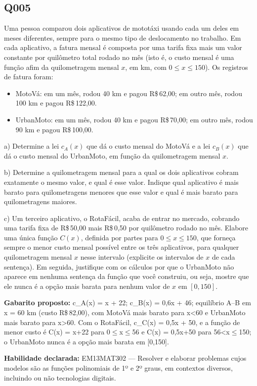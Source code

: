\documentclass[11pt,a4paper]{article}
\begin{document}
\begin{samepage}
\subsection*{Q005}
Uma pessoa comparou dois aplicativos de mototáxi usando cada um deles em meses diferentes, sempre para o mesmo tipo de deslocamento no trabalho. Em cada aplicativo, a fatura mensal é composta por uma tarifa fixa mais um valor constante por quilômetro total rodado no mês (isto é, o custo mensal é uma função afim da quilometragem mensal $x$, em km, com $0 \le x \le 150$). Os registros de fatura foram:

\begin{itemize}[nosep,leftmargin=*]
\item MotoVá: em um mês, rodou 40 km e pagou R\$\,62,00; em outro mês, rodou 100 km e pagou R\$\,122,00.
\item UrbanMoto: em um mês, rodou 40 km e pagou R\$\,70,00; em outro mês, rodou 90 km e pagou R\$\,100,00.
\end{itemize}

a) Determine a lei $c_A(x)$ que dá o custo mensal do MotoVá e a lei $c_B(x)$ que dá o custo mensal do UrbanMoto, em função da quilometragem mensal $x$.

b) Determine a quilometragem mensal para a qual os dois aplicativos cobram exatamente o mesmo valor, e qual é esse valor. Indique qual aplicativo é mais barato para quilometragens menores que esse valor e qual é mais barato para quilometragens maiores.

c) Um terceiro aplicativo, o RotaFácil, acaba de entrar no mercado, cobrando uma tarifa fixa de R\$\,50,00 mais R\$\,0,50 por quilômetro rodado no mês. Elabore uma única função $C(x)$, definida por partes para $0 \le x \le 150$, que forneça sempre o menor custo mensal possível entre os três aplicativos, para qualquer quilometragem mensal $x$ nesse intervalo (explicite os intervalos de $x$ de cada sentença). Em seguida, justifique com os cálculos por que o UrbanMoto não aparece em nenhuma sentença da função que você construiu, ou seja, mostre que ele nunca é a opção mais barata para nenhum valor de $x$ em $[0,150]$.

\textbf{Gabarito proposto:} c\_A(x) = x + 22; c\_B(x) = 0,6x + 46; equilíbrio A–B em x = 60 km (custo R\$\,82,00), com MotoVá mais barato para x<60 e UrbanMoto mais barato para x>60. Com o RotaFácil, c\_C(x) = 0,5x + 50, e a função de menor custo é C(x) = x+22 para 0$\le$x$\le$56 e C(x) = 0,5x+50 para 56<x$\le$150; o UrbanMoto nunca é a opção mais barata em [0,150].

\textbf{Habilidade declarada:} EM13MAT302 --- Resolver e elaborar problemas cujos modelos são as funções polinomiais de 1º e 2º graus, em contextos diversos, incluindo ou não tecnologias digitais.
\end{samepage}
\end{document}
